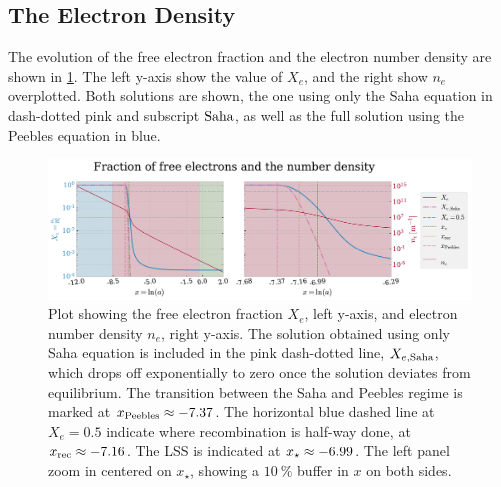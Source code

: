 \documentclass[10pt,a4paper]{article}
\begin{document}
\subsection{The Electron Density}
\label{subsec:Results/Electron density}
The evolution of the free electron fraction and the electron number density are shown in \cref{fig:Xe and ne}. The left y-axis show the value of $X_e$, and the right show $n_e$ overplotted. Both solutions are shown, the one using only the Saha equation in dash-dotted pink and subscript $\rm{Saha}$, as well as the full solution using the Peebles equation in blue.
\begin{figure}[ht]
    \centering
    \includegraphics[scale=0.5]{../figs/free_electrons.pdf}
    \caption{Plot showing the free electron fraction $X_e$, left y-axis, and electron number density $n_e$, right y-axis. The solution obtained using only Saha equation is included in the pink dash-dotted line, $X_{e,\rm{Saha}}$, which drops off exponentially to zero once the solution deviates from equilibrium. The transition between the Saha and Peebles regime is marked at $x_{\rm{Peebles}}\approx-7.37$. The horizontal blue dashed line at $X_e=0.5$ indicate where recombination is half-way done, at $x_{\rm{rec}}\approx-7.16$. The LSS is indicated at $x_{\rm{\star}}\approx-6.99 $. The left panel zoom in centered on $x_{\star}$, showing a $\SI{10}{\%}$ buffer in $x$ on both sides.}
    \label{fig:Xe and ne}
\end{figure}
\end{document}
